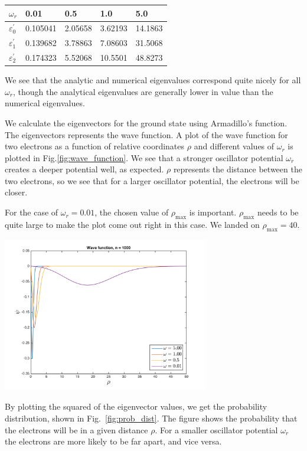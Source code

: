 \documentclass{article}
\begin{document}
\begin{multicols}{2}
\begin{center}
\begin{tabular}{ l l l l l }\hline
	$\omega_r$ 	& 0.01		& 0.5				& 1.0		&5.0\\ \hline
	$\varepsilon_0^{'}$ 	& 0.105041	& 2.05658		& 3.62193	& 14.1863\\
	$\varepsilon_1^{'}$ 	& 0.139682	& 3.78863		& 7.08603& 31.5068 \\
	$\varepsilon_2^{'}$ 	& 0.174323	& 5.52068		& 10.5501	& 48.8273\\
	\hline
\end{tabular}
\end{center}
We see that the analytic and numerical eigenvalues correspond quite nicely for all $\omega_r$, though the analytical eigenvalues are generally lower in value than the numerical eigenvalues.

We calculate the eigenvectors for the ground state using Armadillo's \verb@eigsym@ function. The eigenvectors represents the wave function. A plot of the wave function for two electrons as a function of relative coordinates $\rho$ and different values of $\omega_r$ is plotted in Fig.\ref{fig:wave_function}. We see that a stronger oscillator potential $\omega_r$ creates a deeper potential well, as expected. $\rho$ represents the distance between the two electrons, so we see that for a larger oscillator potential, the electrons will be closer.

For the case of $\omega_r = 0.01$, the chosen value of $\rho_{\mathrm{max}}$ is important. $\rho_{\mathrm{max}}$ needs to be quite large to make the plot come out right in this case. We landed on $\rho_{\mathrm{max}} = 40$.

\begin{center}
	\includegraphics[width=90mm]{../build-Project2-Desktop_Qt_5_5_0_clang_64bit-Debug/wave_function.png} 	
	\label{fig:wave_function}
\end{center}
By plotting the squared of the eigenvector values, we get the probability distribution, shown in Fig.~\ref{fig:prob_dist}. The figure shows the probability that the electrons will be in a given distance $\rho$.  For a smaller oscillator potential $\omega_r$ the electrons are more likely to be far apart, and vice versa.


\end{multicols}
\end{document}
